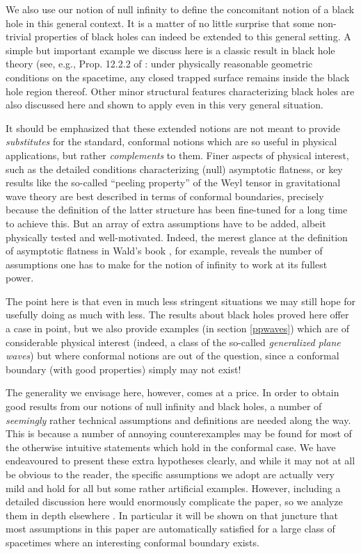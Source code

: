 We also use our notion of null infinity to define the concomitant notion of a black hole in this general context. It is a matter of no little surprise that some non-trivial properties of black holes can indeed be extended to this general setting. A simple but important example we discuss here is a classic result in black hole theory (see, e.g., Prop. 12.2.2 of \cite{WaldGeneralRelativity1984}: under physically reasonable geometric conditions on the spacetime, any closed trapped surface remains inside the black hole region thereof. Other minor structural features characterizing black holes are also discussed here and shown to apply even in this very general situation.

It should be emphasized that these extended notions are not meant to provide {\em substitutes} for the standard, conformal notions which are so useful in physical applications, but rather {\em complements} to them. Finer aspects of physical interest, such as the detailed conditions characterizing (null) asymptotic flatness, or key results like the so-called ``peeling property'' of the Weyl tensor in gravitational wave theory \cite{SachsPeeling1961} are best described in terms of conformal boundaries, precisely because the definition of the latter structure has been fine-tuned for a long time to achieve this. But an array of extra assumptions have to be added, albeit physically tested and well-motivated. Indeed, the merest glance at the definition of asymptotic flatness in Wald's book \cite{WaldGeneralRelativity1984}, for example, reveals the number of assumptions one has to make for the notion of infinity to work at its fullest power.

The point here is that even in much less stringent situations we may still hope for usefully doing as much with less. The results about black holes proved here offer a case in point, but we also provide examples (in section \ref{ppwaves}) which are of considerable physical interest (indeed, a class of the so-called {\em generalized plane waves}) but where conformal notions are out of the question, since a conformal boundary (with good properties) simply may not exist!

The generality we envisage here, however, comes at a price. In order to obtain good results from our notions of null infinity and black holes, a number of {\em seemingly} rather technical assumptions and definitions are needed along the way. This is because a number of annoying counterexamples may be found for most of the otherwise intuitive statements which hold in the conformal case. We have endeavoured to present these extra hypotheses clearly, and while it may not at all be obvious to the reader, the specific assumptions we adopt are actually very mild and hold for all but some rather artificial examples. However, including a detailed discussion here would enormously complicate the paper, so we analyze them in depth elsewhere \cite{CostaFloresHerrera2018-2}. In particular it will be shown on that juncture that most assumptions in this paper are automatically satisfied for a large class of spacetimes where an interesting conformal boundary exists.

